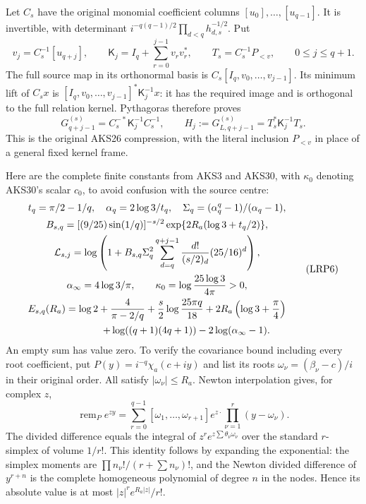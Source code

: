 Let $C_s$ have the original monomial coefficient columns
$[u_0],\ldots,[u_{q-1}]$. It is invertible, with determinant
$i^{-q(q-1)/2}\prod_{d<q}h_{d,s}^{-1/2}$. Put
\[
 v_j=C_s^{-1}[u_{q+j}],\qquad
 \mathsf K_j=I_q+\sum_{r=0}^{j-1}v_rv_r^*,\qquad
 T_s=C_s^{-1}P_{<v},\qquad 0\le j\le q+1.
 \tag{LRP4}
\]
The full source map in its orthonormal basis is
$C_s[I_q,v_0,\ldots,v_{j-1}]$. Its minimum lift of $C_sx$ is
$[I_q,v_0,\ldots,v_{j-1}]^*\mathsf K_j^{-1}x$:
it has the required image and is orthogonal to the full relation kernel.
Pythagoras therefore proves
\[
 G_{q+j-1}^{(s)}=C_s^{-*}\mathsf K_j^{-1}C_s^{-1},\qquad
 H_j:=G_{L,q+j-1}^{(s)}=T_s^*\mathsf K_j^{-1}T_s.
 \tag{LRP5}
\]
This is the original AKS26 compression, with the literal inclusion
$P_{<v}$ in place of a general fixed kernel frame.

Here are the complete finite constants from AKS3 and AKS30, with
$\kappa_0$ denoting AKS30's scalar $c_0$, to avoid confusion with the
source centre:
\[
\begin{gathered}
 t_q=\pi/2-1/q,\quad \alpha_q=2\log3/t_q,\quad
 \Sigma_q=(\alpha_q^q-1)/(\alpha_q-1),\\
 B_{s,q}=[(9/25)\sin(1/q)]^{-s/2}
           \exp\{2R_a(\log3+t_q/2)\},\\
 \mathcal L_{s,j}=
 \log\left(1+B_{s,q}\Sigma_q^2
        \sum_{d=q}^{q+j-1}\frac{d!}{(s/2)_d}(25/16)^d\right),\\
 \alpha_\infty=4\log3/\pi,\qquad
 \kappa_0=\log\frac{25\log3}{4\pi}>0,\\
 E_{s,q}(R_a)=\log2+\frac4{\pi-2/q}
       +\frac{s}{2}\log\frac{25\pi q}{18}
       +2R_a\left(\log3+\frac\pi4\right)\\
 \hspace{21mm}+\log((q+1)(4q+1))-2\log(\alpha_\infty-1).
\end{gathered}\tag{LRP6}
\]
An empty sum has value zero. To verify the covariance bound including
every root coefficient, put $P(y)=i^{-q}\chi_a(c+iy)$ and list its
roots $\omega_\nu=(\beta_\nu-c)/i$ in their original order. All satisfy
$|\omega_\nu|\le R_a$. Newton interpolation gives, for complex $z$,
\[
 \operatorname{rem}_P e^{zy}=
 \sum_{r=0}^{q-1}[\omega_1,\ldots,\omega_{r+1}]e^{z\cdot}
       \prod_{\nu=1}^{r}(y-\omega_\nu).
\]
The divided difference equals the integral of
$z^r e^{z\sum\theta_\nu\omega_\nu}$ over the standard $r$-simplex
of volume $1/r!$. This identity follows by expanding the exponential:
the simplex moments are $\prod n_\nu!/(r+\sum n_\nu)!$, and the
Newton divided difference of $y^{r+n}$ is the complete homogeneous
polynomial of degree $n$ in the nodes. Hence its absolute value is at
most $|z|^r e^{R_a|z|}/r!$.

